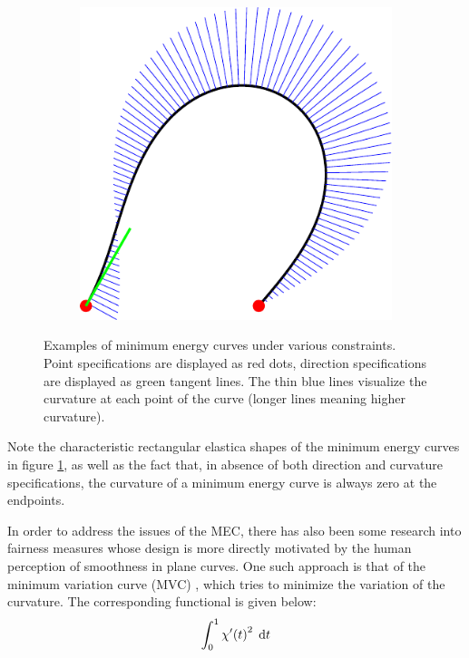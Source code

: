 \documentclass[a4paper]{article}
\begin{document}
\begin{figure}[htb]
\begin{subfigure}[b]{\textwidth / 3}
					\end{subfigure}%
					\begin{subfigure}[b]{\textwidth / 3}
						\includegraphics[width=\textwidth]{content/output/fairness_mec_3.pdf}
					\end{subfigure}
					\caption{Examples of minimum energy curves under various constraints. Point specifications are displayed as red dots, direction specifications are displayed as green tangent lines. The thin blue lines visualize the curvature at each point of the curve (longer lines meaning higher curvature).}
					\label{figure:minimum_energy_curve_examples}
				\end{figure}

				Note the characteristic rectangular elastica shapes of the minimum energy curves in figure \ref{figure:minimum_energy_curve_examples}, as well as the fact that, in absence of both direction and curvature specifications, the curvature of a minimum energy curve is always zero at the endpoints.

				In order to address the issues of the MEC, there has also been some research into fairness measures whose design is more directly motivated by the human perception of smoothness in plane curves. One such approach is that of the minimum variation curve (MVC) \cite{thesis-mvc}, which tries to minimize the variation of the curvature. The corresponding functional is given below:
				\begin{equation*}
					\int_{0}^{1} \chi'\!\left( t \right)^2 \; \mathrm{d}t
				\end{equation*}
\end{document}
